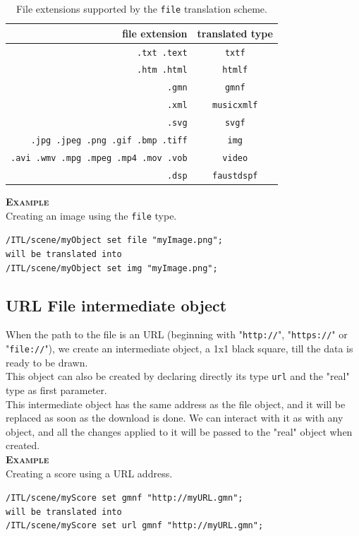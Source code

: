 \documentclass[a4paper,twoside]{report}
\newcommand{\subsublevel}[1]	{\subsection{#1}}
\newcommand{\OSC}[1]		{\texttt{#1}}
\newcommand{\example}		{\textbf{\hspace{-1.5cm}\textbf{\textsc{Example }}}}
\newcommand{\sample}	[1]			{\vspace{-2mm}\begin{center}\colorbox{mygrey}{
								\begin{minipage}[t]{0.9\columnwidth} 
								{\small \texttt{#1}}
								\end{minipage}}\end{center}}
\begin{document}
\begin{table}[htdp]
\caption{File extensions supported by the \OSC{file} translation scheme.}
\begin{center}
\begin{tabular}{|r|c|}
\hline
file extension & translated type \\
\hline
\OSC{.txt .text}		& \OSC{txtf} \\
\OSC{.htm .html}		& \OSC{htmlf} \\
\OSC{.gmn}			& \OSC{gmnf} \\
\OSC{.xml}			& \OSC{musicxmlf} \\
\OSC{.svg} 			& \OSC{svgf} \\
\OSC{.jpg .jpeg .png .gif .bmp .tiff} & \OSC{img} \\
\OSC{.avi .wmv .mpg .mpeg .mp4 .mov .vob} & \OSC{video} \\
\OSC{.dsp} 			& \OSC{faustdspf} \\
\hline
\end{tabular}
\end{center}
\label{fileTranslate}
\end{table}

\example \\
Creating an image using the \OSC{file} type.
\sample{/ITL/scene/myObject set file "myImage.png"; \\
will be translated into \\
/ITL/scene/myObject set img "myImage.png";
}

\subsublevel{URL File intermediate object}
\label{urlset}

When the path to the file is an URL (beginning with "\OSC{http://}", "\OSC{https://}" or "\OSC{file://}"), we create an intermediate object, a 1x1 black square, till the data is ready to be drawn.\\
This object can also be created by declaring directly its type \OSC{url} and the "real" type as first parameter.
\\

This intermediate object has the same address as the file object, and it will be replaced as soon as the download is done. We can interact with it as with any object, and all the changes applied to it will be passed to the "real" object when created.
\\

\example \\
Creating a score using a URL address.
\sample{/ITL/scene/myScore set gmnf "http://myURL.gmn"; \\
will be translated into \\
/ITL/scene/myScore set url gmnf "http://myURL.gmn";
}
\end{document}
